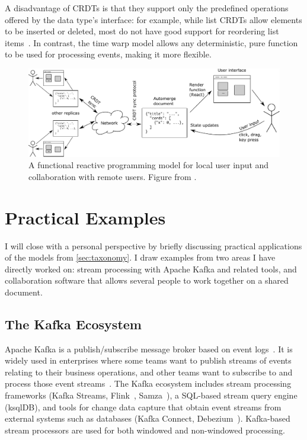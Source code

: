 \documentclass[sigconf]{acmart}
\begin{document}
A disadvantage of CRDTs is that they support only the predefined operations offered by the data type's interface: for example, while list CRDTs allow elements to be inserted or deleted, most do not have good support for reordering list items~\cite{Kleppmann:2020}.
In contrast, the time warp model allows any deterministic, pure function to be used for processing events, making it more flexible.

\begin{figure}
\centering
\includegraphics{document-frp.pdf}
\caption{A functional reactive programming model for local user input and collaboration with remote users. Figure from \cite{vanHardenberg:2020}.}
\label{fig:pushpin}
\end{figure}

\section{Practical Examples}\label{sec:practical}

I will close with a personal perspective by briefly discussing practical applications of the models from \autoref{sec:taxonomy}.
I draw examples from two areas I have directly worked on: stream processing with Apache Kafka and related tools, and collaboration software that allows several people to work together on a shared document.

\subsection{The Kafka Ecosystem}\label{sec:kafka}

Apache Kafka is a publish/subscribe message broker based on event logs~\cite{Kreps:2011,Wang:2015}.
It is widely used in enterprises where some teams want to publish streams of events relating to their business operations, and other teams want to subscribe to and process those event streams~\cite{Kreps:2013}.
The Kafka ecosystem includes stream processing frameworks (Kafka Streams, Flink~\cite{Carbone:2015}, Samza~\cite{Kleppmann:2015,Noghabi:2017}), a SQL-based stream query engine (ksqlDB), and tools for change data capture that obtain event streams from external systems such as databases (Kafka Connect, Debezium~\cite{Debezium}).
Kafka-based stream processors are used for both windowed and non-windowed processing.
\end{document}
